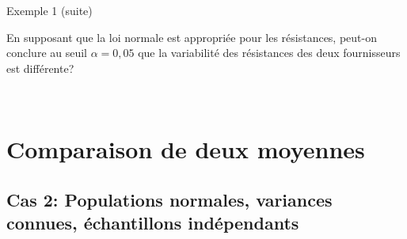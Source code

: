\documentclass{BeamerTemplate}
\begin{document}
\begin{frame}[t]{Exemple 1 (suite)}

En supposant que la loi normale est appropriée pour les résistances, peut-on conclure au seuil $\alpha = 0,05$ que la variabilité des résistances des deux fournisseurs est différente?

{\ }
\end{frame}



\section[Comparer 2 moyennes]{Comparaison de deux moyennes}

\subsection{Cas 2: Populations normales, variances connues, échantillons indépendants}
\end{document}
